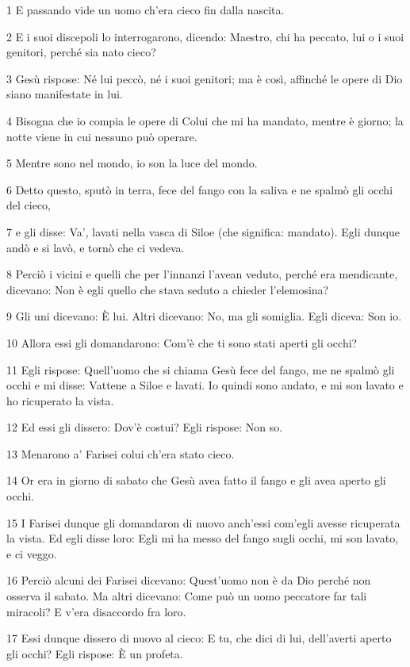\par 1 E passando vide un uomo ch'era cieco fin dalla nascita.
\par 2 E i suoi discepoli lo interrogarono, dicendo: Maestro, chi ha peccato, lui o i suoi genitori, perché sia nato cieco?
\par 3 Gesù rispose: Né lui peccò, né i suoi genitori; ma è così, affinché le opere di Dio siano manifestate in lui.
\par 4 Bisogna che io compia le opere di Colui che mi ha mandato, mentre è giorno; la notte viene in cui nessuno può operare.
\par 5 Mentre sono nel mondo, io son la luce del mondo.
\par 6 Detto questo, sputò in terra, fece del fango con la saliva e ne spalmò gli occhi del cieco,
\par 7 e gli disse: Va', lavati nella vasca di Siloe (che significa: mandato). Egli dunque andò e si lavò, e tornò che ci vedeva.
\par 8 Perciò i vicini e quelli che per l'innanzi l'avean veduto, perché era mendicante, dicevano: Non è egli quello che stava seduto a chieder l'elemosina?
\par 9 Gli uni dicevano: È lui. Altri dicevano: No, ma gli somiglia. Egli diceva: Son io.
\par 10 Allora essi gli domandarono: Com'è che ti sono stati aperti gli occhi?
\par 11 Egli rispose: Quell'uomo che si chiama Gesù fece del fango, me ne spalmò gli occhi e mi disse: Vattene a Siloe e lavati. Io quindi sono andato, e mi son lavato e ho ricuperato la vista.
\par 12 Ed essi gli dissero: Dov'è costui? Egli rispose: Non so.
\par 13 Menarono a' Farisei colui ch'era stato cieco.
\par 14 Or era in giorno di sabato che Gesù avea fatto il fango e gli avea aperto gli occhi.
\par 15 I Farisei dunque gli domandaron di nuovo anch'essi com'egli avesse ricuperata la vista. Ed egli disse loro: Egli mi ha messo del fango sugli occhi, mi son lavato, e ci veggo.
\par 16 Perciò alcuni dei Farisei dicevano: Quest'uomo non è da Dio perché non osserva il sabato. Ma altri dicevano: Come può un uomo peccatore far tali miracoli? E v'era disaccordo fra loro.
\par 17 Essi dunque dissero di nuovo al cieco: E tu, che dici di lui, dell'averti aperto gli occhi? Egli rispose: È un profeta.
